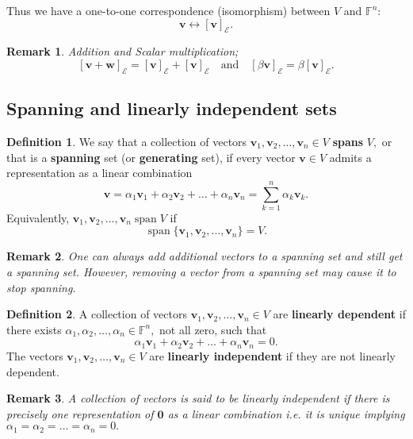 \documentclass[12pt, a4paper]{article}
\newtheorem*{remark}{Remark}
\theoremstyle{definition}
\newtheorem{definition}{Definition}[section]
\theoremstyle{plain}
\newcommand{\bb}[1]{\mathbb{#1}}
\newcommand{\vect}[1]{\mathbf{#1}}
\newcommand{\Cal}[1]{\mathcal{#1}}
\DeclareMathOperator{\Span}{span}
\begin{document}
Thus we have a one-to-one correspondence (isomorphism) between $V$ and $\bb{F}^n:$ $$\vect{v} \longleftrightarrow [\vect{v}]_{\Cal{E}}.$$

\begin{remark}
Addition and Scalar multiplication; $$[\vect{v+w}]_{\Cal{E}}=[\vect{v}]_{\Cal{E}}+[\vect{v}]_{\Cal{E}} \quad \text{and} \quad [\beta\vect{v}]_{\Cal{E}}=\beta[\vect{v}]_{\Cal{E}}.$$
\end{remark}

\subsection{Spanning and linearly independent sets}

\begin{definition} We say that a collection of vectors $\vect{v}_1,\vect{v}_2,\ldots,\vect{v}_n \in V$ \textbf{spans} $V,$ or that is a \textbf{spanning} set (or \textbf{generating} set), if every vector $\vect{v} \in V$ admits a representation as a linear combination $$\vect{v} = \alpha_1\vect{v}_1+\alpha_2\vect{v}_2+\ldots+\alpha_n\vect{v}_n = \sum_{k=1}^{n} \alpha_k\vect{v}_k.$$ Equivalently, $\vect{v}_1,\vect{v}_2,\ldots,\vect{v}_n \Span{V}$ if $$\Span\{\vect{v}_1,\vect{v}_2,\ldots,\vect{v}_n\}=V.$$
\end{definition}

\begin{remark}
One can always add additional vectors to a spanning set and still get a spanning set. However, removing a vector from a spanning set may cause it to stop spanning.
\end{remark} 

\begin{definition} A collection of vectors $\vect{v}_1,\vect{v}_2,\ldots,\vect{v}_n \in V$ are \textbf{linearly dependent} if there exists $\alpha_1,\alpha_2,\ldots,\alpha_n \in \bb{F}^n,$ not all zero, such that $$\alpha_1\vect{v}_1+\alpha_2\vect{v}_2+\ldots+\alpha_n\vect{v}_n =0.$$ The vectors $\vect{v}_1,\vect{v}_2,\ldots,\vect{v}_n \in V$ are \textbf{linearly independent} if they are not linearly dependent. \end{definition}

\begin{remark}
A collection of vectors is said to be linearly independent if there is precisely one representation of $\vect{0}$ as a linear combination i.e. it is unique implying $\alpha_1=\alpha_2=\ldots=\alpha_n=0.$
\end{remark}
\end{document}
